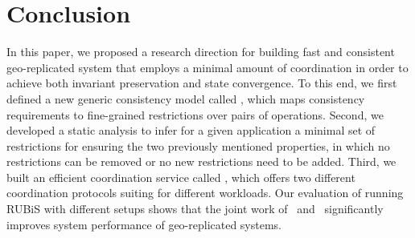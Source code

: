 \section{Conclusion}
\label{ch:por:sect:conclude}
In this paper, we proposed a research direction for building fast and consistent
geo-replicated system that employs a minimal amount of coordination in
order to achieve both invariant preservation and state convergence. 
To this end, we first defined a new generic consistency model called \PRCN, which maps
consistency requirements to fine-grained restrictions over pairs of operations. Second,
we developed a static analysis to infer for a given application
a minimal set of restrictions for ensuring the two previously mentioned properties, in which
no restrictions can be removed or no new restrictions need to be added. Third, we built an efficient
coordination service called \coordtool, which offers two different coordination protocols
suiting for different workloads. Our evaluation of running RUBiS with different
setups shows that the joint work of \PRCN\ and \coordtool\ significantly
improves system performance of geo-replicated systems.

